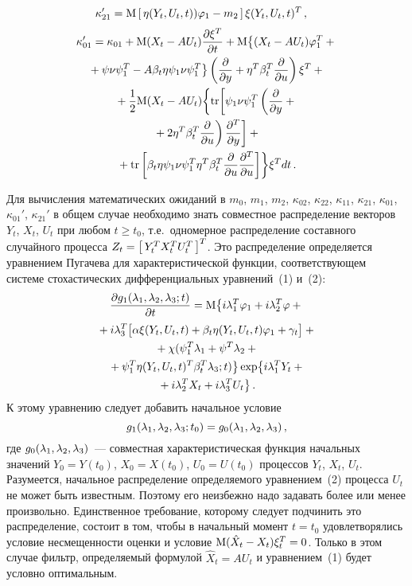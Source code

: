 \begin{multicols}{2}
\begin{align*}
    \kappa_{21}' &= {\rm M} \lk \eta\yutt)\varphi_1-m_2\rk \xi\yutt^T\, , %
\end{align*}
\vspace*{-24pt}
\begin{multline*}
\kappa_{01}' =\kappa_{01} + {\rm M} (X_t-AU_t)  \frac{\partial \xi^T}{\partial 
t} +
     {\rm M}\bigl\{ (X_t-AU_t) \varphi_1^T +{}\\
{}+\psi\nu\psi_1^T - A\beta_t\eta\psi_1\nu\psi_1^T\bigr\} \left(
    \frac{\partial}{\partial y}+\eta^T\beta_t^T \frac{\partial}{\partial u}\right)\xi^T+{}\\
    {}+\frac{1}{2} {\rm M}(X_t-AU_t) \biggl\{ {\rm tr} \biggl[ \psi_1\nu\psi_1^T
    \left( \frac{\partial}{\partial y}+{} \right.\\
\left.    {}+2 \eta^T\beta_t^T \frac{\partial}{\partial u}\right)
    \frac{\partial^T}{\partial y}\biggr]+{}\\
{}+    {\rm tr}\left[ \beta_t\eta\psi_1\nu\psi_1^T\eta^T\beta_t^T 
\frac{\partial}{\partial u}
    \frac{\partial^T}{\partial u}\right]\biggr\} \xi^T dt\,.
\end{multline*}

Для вычисления математических ожиданий в $m_0$, $m_1$, $m_2$,
$\kappa_{02}$, $\kappa_{22}$, $\kappa_{11}$, $\kappa_{21}$,
$\kappa_{01}$, $\kappa_{01}'$, $\kappa_{21}'$ в общем случае
необходимо
 знать совместное распределение векторов  $Y_t$, $X_t$, $U_t$ при
 любом  $t\ge t_0$, т.е.\ одномерное распределение составного
 случайного процесса  $Z_t = \left[\, Y_t^T X_t^T U_t^T\,\right]^T$. Это
 распределение определяется уравнением Пугачева для характеристической функции, соответствующем
 системе стохастических дифференциальных уравнений~(1) и~(2):
 \begin{multline}
\displaystyle\frac{\displaystyle \partial g_1 (\lambda_1,\lambda_2,\lambda_3;t)\mathstrut}{\displaystyle \partial t\mathstrut}
= {\rm M}\bigl\{ i\lambda_1^T \varphi_1 + i\lambda_2^T \varphi+{}\\
{}+i\lambda_3^T\bigl[ \alpha\xi (Y_t, U_t,t)+\beta_t\eta(Y_t, U_t,t) \varphi_1 +\gamma_t\bigr]+{}\\
    {}+\chi (\psi_1^T \lambda_1 +\psi^T\lambda_2+{}\\
    {}+\psi_1^T\eta (Y_t, U_t,t)^T\beta_t^T \lambda_3;t)\bigr\} \exp \bigl\{ i\lambda_1^T Y_t+{}\\
    {}+i\lambda_2^T X_t + i\lambda_3^T U_t\bigr\}\,.
\end{multline}
К этому уравнению следует добавить начальное условие
 $$g_1 (\lambda_1,\lambda_2,\lambda_3;t_0)=g_0
 (\lambda_1,\lambda_2,\lambda_3)\,,$$
где $g_0 (\lambda_1,\lambda_2,\lambda_3)$~--- совместная характеристическая
функция начальных значений  $Y_0 = Y(t_0)$, $X_0 = X(t_0)$,
$U_0=U(t_0)$  процессов  $Y_t$, $X_t$, $U_t$.
Разумеется, начальное распределение определяемого уравнением~(2)
процесса $U_t$ не может быть известным. Поэтому его неизбежно надо
задавать более или менее произвольно. Единственное требование,
которому следует подчинить это распределение, состоит в том, чтобы
в начальный момент $t=t_0$ удовлетворялись условие несмещенности
оценки и условие ${\rm M} (\hat X_t - X_t)\xi_t^T=0$. Только в
этом случае фильтр, определяемый формулой  $\hat X_t = AU_t$ и
уравнением~(1) будет условно оптимальным.


\end{multicols}

